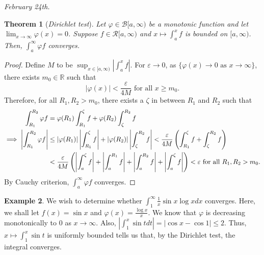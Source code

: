 \documentclass[15pt,a4paper]{book}
\newtheorem{theorem}{Theorem}[chapter]
\theoremstyle{definition}
\newtheorem{example}[theorem]{Example}
\newcommand{\eax}[1]{\emph{#1}\index{#1}} %
\newcommand{\abs}[1]{\left| #1 \right|} %
\newcommand{\R}{\mathbb{R}} %
\newcommand{\cR}{\mathcal{R}}
\newcommand{\cB}{\mathcal{B}}
\begin{document}
\textit{February 24th.}

\begin{theorem}[\eax{Dirichlet test}]
    Let $\varphi \in \cB[a,\infty)$ be a monotonic function and let $\lim_{x \to \infty} \varphi(x) = 0$. Suppose $f \in \cR[a,\infty)$ and $x \mapsto \int_{a}^{x}f$ is bounded on $[a,\infty)$. Then, $\int_{a}^{\infty} \varphi f$ converges.
\end{theorem}
\begin{proof}
    Define $M$ to be $\sup_{x \in [a,\infty)} \abs{\int_{a}^{x} f}$. For $\varepsilon \to 0$, as $\{\varphi(x) \to 0 \text{ as } x \to \infty\}$, there exists $m_{0} \in \R$ such that
    \begin{equation}
        \abs{\varphi(x)} < \frac{\varepsilon}{4M} \text{ for all } x \geq m_{0}.
    \end{equation}
    Therefore, for all $R_{1},R_{2} > m_{0}$, there exists a $\zeta$ in between $R_{1}$ and $R_{2}$ such that 
    \begin{align}
        \int_{R_{1}}^{R_{2}} \varphi f &= \varphi(R_{1}) \int_{R_{1}}^{\zeta} f + \varphi(R_{2}) \int_{\zeta}^{R_{2}} f \\
        \implies \abs{\int_{R_{1}}^{R_{2}} \varphi f} &\leq \abs{\varphi(R_{1})} \abs{\int_{R_{1}}^{\zeta} f} + \abs{\varphi(R_{2})} \abs{\int_{\zeta}^{R_{2}} f} < \frac{\varepsilon}{4M} \left( \int_{R_{1}}^{\zeta} f + \int_{\zeta}^{R_{2}} f \right) \notag \\
        &< \frac{\varepsilon}{4M} \left( \abs{\int_{a}^{\zeta}f} + \abs{\int_{a}^{R_{1}} f} + \abs{\int_{a}^{R_{2}} f} + \abs{\int_{a}^{\zeta} f} \right) < \varepsilon \text{ for all } R_{1},R_{2} > m_{0}.
    \end{align}
    By Cauchy criterion, $\int_{a}^{\infty} \varphi f$ converges.
\end{proof}

\begin{example}
    We wish to determine whether $\int_{1}^{\infty} \frac{1}{x} \sin x \log x dx$ converges. Here, we shall let $f(x) = \sin x$ and $\varphi(x) = \frac{\log x}{x}$. We know that $\varphi$ is decreasing monotonically to $0$ as $x \to \infty$. Also, $\abs{\int_{1}^{x} \sin t dt} = \abs{\cos x - \cos 1} \leq 2$. Thus, $x \mapsto \int_{1}^{x} \sin t$ is uniformly bounded tells us that, by the Dirichlet test, the integral converges.
\end{example}
\end{document}
